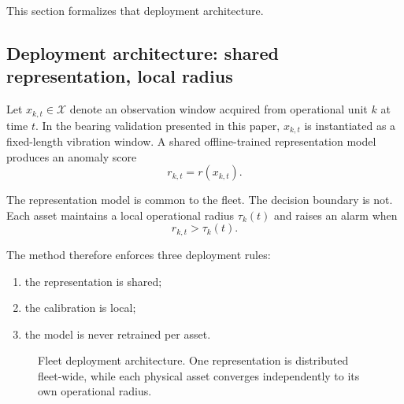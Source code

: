\documentclass[11pt,a4paper]{article}
\newcommand{\X}{\ensuremath{\mathcal{X}}}
\begin{document}
This section formalizes that deployment architecture.

\subsection{Deployment architecture: shared representation, local radius}

Let $x_{k,t}\in\X$ denote an observation window acquired from operational unit $k$ at time
$t$. In the bearing validation presented in this paper, $x_{k,t}$ is instantiated as a
fixed-length vibration window. A shared
offline-trained representation model produces an anomaly score
\begin{equation}
r_{k,t}=r(x_{k,t}).
\label{eq:score}
\end{equation}

The representation model is common to the fleet. The decision boundary is not. Each asset
maintains a local operational radius $\tau_k(t)$ and raises an alarm when
\begin{equation}
r_{k,t}>\tau_k(t).
\label{eq:decision}
\end{equation}

The method therefore enforces three deployment rules:

\begin{enumerate}[leftmargin=1.5em]
    \item the representation is shared;
    \item the calibration is local;
    \item the model is never retrained per asset.
\end{enumerate}

\begin{figure}[H]
\centering
{}
\caption{Fleet deployment architecture. One representation is distributed fleet-wide, while
each physical asset converges independently to its own operational radius.}
\label{fig:deployment-architecture}
\end{figure}
\end{document}
